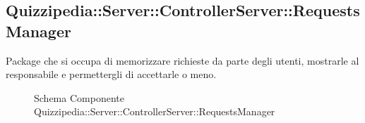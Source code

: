 \subsection{Quizzipedia::Server::ControllerServer::RequestsManager}
Package che si occupa di memorizzare richieste da parte degli utenti, mostrarle al responsabile e permettergli di accettarle o meno.
\begin{figure}[H]
\centering
\noindent{}
\caption[Schema Componente Quizzipedia::Server::ControllerServer::RequestsManager]{Schema Componente Quizzipedia::Server::ControllerServer::RequestsManager}
\end{figure}
